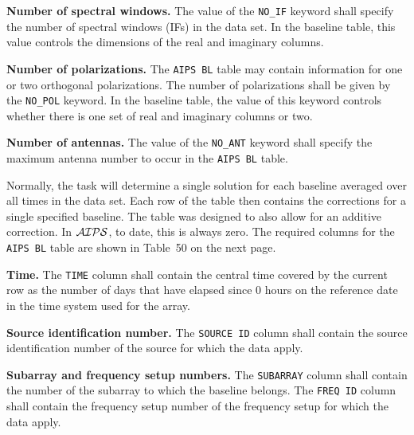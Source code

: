 \documentclass[twoside]{article}
\newcommand{\AIPS}{{$\cal AIPS\/$}}
\begin{document}
{\bf Number of spectral windows.} The value of the {\tt NO\_IF}
keyword shall specify the number of spectral windows (IFs) in the data
set.  In the baseline table, this value controls the dimensions of the
real and imaginary columns.

{\bf Number of polarizations.}  The {\tt AIPS BL} table may contain
information for one or two orthogonal polarizations.  The number of
polarizations shall be given by the {\tt NO\_POL} keyword.   In the
baseline table, the value of this keyword controls whether there is
one set of real and imaginary columns or two.

{\bf Number of antennas.} The value of the {\tt NO\_ANT} keyword shall
specify the maximum antenna number to occur in the {\tt AIPS BL} table.

Normally, the task will determine a single solution for each baseline
averaged over all times in the data set.  Each row of the table then
contains the corrections for a single specified baseline.  The table
was designed to also allow for an additive correction.  In \AIPS, to
date, this is always zero.  The required columns for the {\tt AIPS
  BL} table are shown in Table~50 on the next page.

{\bf Time.}  The {\tt TIME} column shall contain the central time
covered by the current row as the number of days that have elapsed
since 0 hours on the reference date in the time system used for the
array.

{\bf Source identification number.}  The {\tt SOURCE ID} column shall
contain the source identification number of the source for which the
data apply.

{\bf Subarray  and frequency setup numbers.} The {\tt SUBARRAY} column
shall contain the number of the subarray to which the baseline belongs.
The {\tt FREQ ID} column shall contain the frequency setup number of
the frequency setup for which the data apply.
\end{document}
